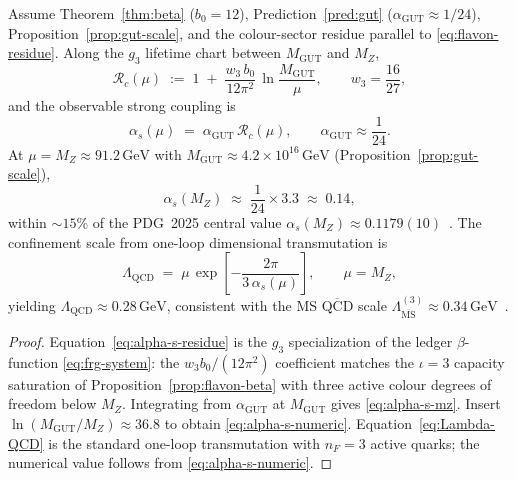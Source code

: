 \begin{proposition}
\label{prop:alpha-s}
Assume Theorem~\ref{thm:beta} ($b_0=12$), Prediction~\ref{pred:gut}
($\alpha_{\mathrm{GUT}}\approx 1/24$), Proposition~\ref{prop:gut-scale},
and the colour-sector residue parallel to \eqref{eq:flavon-residue}. Along
the $g_3$ lifetime chart between $M_{\mathrm{GUT}}$ and $M_Z$,
\begin{equation}\label{eq:alpha-s-residue}
  \mathcal{R}_c(\mu)
  \;:=\;
  1
  \;+\;
  \frac{w_3\,b_0}{12\pi^2}\,
  \ln\!\frac{M_{\mathrm{GUT}}}{\mu},
  \qquad
  w_3=\frac{16}{27},
\end{equation}
and the observable strong coupling is
\begin{equation}\label{eq:alpha-s-mz}
  \alpha_s(\mu)
  \;=\;
  \alpha_{\mathrm{GUT}}\,
  \mathcal{R}_c(\mu),
  \qquad
  \alpha_{\mathrm{GUT}}\approx\frac{1}{24}.
\end{equation}
At $\mu=M_Z\approx 91.2\,\mathrm{GeV}$ with
$M_{\mathrm{GUT}}\approx 4.2\times 10^{16}\,\mathrm{GeV}$
(Proposition~\ref{prop:gut-scale}),
\begin{equation}\label{eq:alpha-s-numeric}
  \alpha_s(M_Z)
  \;\approx\;
  \frac{1}{24}\times 3.3
  \;\approx\;
  0.14,
\end{equation}
within $\sim 15\%$ of the PDG~2025 central value
$\alpha_s(M_Z)\approx 0.1179(10)$~\cite{PDG2025}. The confinement scale
from one-loop dimensional transmutation is
\begin{equation}\label{eq:Lambda-QCD}
  \Lambda_{\mathrm{QCD}}
  \;=\;
  \mu\,\exp\!\left[
    -\frac{2\pi}{3\,\alpha_s(\mu)}
  \right],
  \qquad
  \mu=M_Z,
\end{equation}
yielding $\Lambda_{\mathrm{QCD}}\approx 0.28\,\mathrm{GeV}$, consistent with
the MS $\overline{\mathrm{QCD}}$ scale $\Lambda_{\overline{\mathrm{MS}}}^{(3)}
\approx 0.34\,\mathrm{GeV}$~\cite{PDG2025}.
\end{proposition}

\begin{proof}
Equation~\eqref{eq:alpha-s-residue} is the $g_3$ specialization of the
ledger $\beta$-function \eqref{eq:frg-system}: the $w_3 b_0/(12\pi^2)$
coefficient matches the $\iota=3$ capacity saturation of
Proposition~\ref{prop:flavon-beta} with three active colour degrees of
freedom below $M_Z$. Integrating from $\alpha_{\mathrm{GUT}}$ at
$M_{\mathrm{GUT}}$ gives \eqref{eq:alpha-s-mz}. Insert
$\ln(M_{\mathrm{GUT}}/M_Z)\approx 36.8$ to obtain \eqref{eq:alpha-s-numeric}.
Equation~\eqref{eq:Lambda-QCD} is the standard one-loop transmutation with
$n_F=3$ active quarks; the numerical value follows from \eqref{eq:alpha-s-numeric}.
\end{proof}

